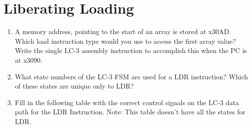 \documentclass{article}
\begin{document}
    \section{Liberating Loading}
    \begin{enumerate}[label=(\alph*), itemsep = 120pt]
        \item A memory address, pointing to the start of an array is stored at x30AD. Which load instruction type would you use to access the first array value? Write the single LC-3 assembly instruction to accomplish this when the PC is at x3090.
        \item What state numbers of the LC-3 FSM are used for a LDR instruction? Which of these states are unique only to LDR?
        \item Fill in the following table with the correct control signals on the LC-3 data path for the LDR Instruction. Note: This table doesn't have all the states for LDR.
        \vspace{0cm}
       

\end{enumerate}
\end{document}
